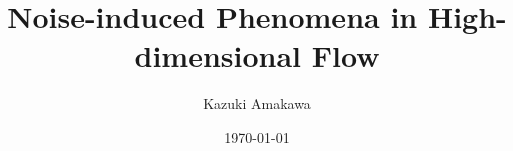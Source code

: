 \documentclass[notheorems, UTF8]{beamer}
\title[High-dim SDE]{Noise-induced Phenomena in High-dimensional Flow}
\author{Kazuki Amakawa}
\institute[HU]
{
Hokkaido University, Department of Mathematics
}
\date{\today}
\begin{document}
\begin{frame}
\titlepage
\end{frame}



\end{document}
